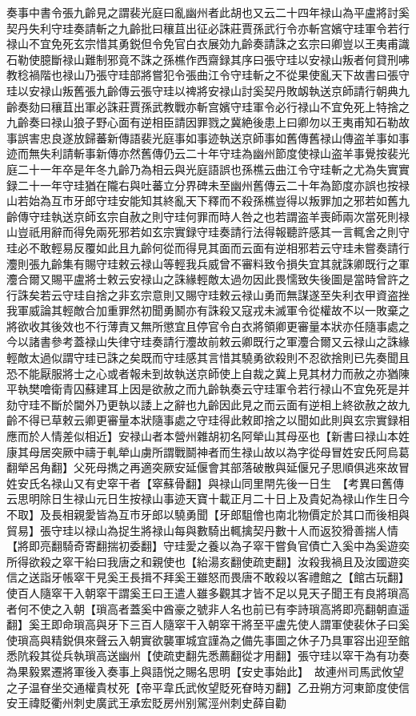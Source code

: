 奏事中書令張九齡見之謂裴光庭曰亂幽州者此胡也又云二十四年禄山為平盧將討奚契丹失利守珪奏請斬之九齡批曰穰苴出征必誅莊賈孫武行令亦斬宫嬪守珪軍令若行禄山不宜免死玄宗惜其勇鋭但令免官白衣展効九齡奏請誅之玄宗曰卿豈以王夷甫識石勒使臆斷禄山難制邪竟不誅之孫樵作西齋録其序曰張守珪以安禄山叛者何貸刑咈教稔禍階也禄山乃張守珪部將嘗犯令張曲江令守珪斬之不從果使亂天下故書曰張守珪以安禄山叛舊張九齡傳云張守珪以禆將安禄山討奚契丹敗衂執送京師請行朝典九齡奏劾曰穰苴出軍必誅莊賈孫武教戰亦斬宫嬪守珪軍令必行禄山不宜免死上特捨之九齡奏曰禄山狼子野心面有逆相臣請因罪戮之冀絶後患上曰卿勿以王夷甫知石勒故事誤害忠良遂放歸蕃新傳語裴光庭事如事迹執送京師事如舊傳舊禄山傳盗羊事如事迹而無失利請斬事新傳亦然舊傳仍云二十年守珪為幽州節度使禄山盗羊事覺按裴光庭二十一年卒是年冬九齡乃為相云與光庭語誤也孫樵云曲江令守珪斬之尤為失實實録二十一年守珪猶在隴右與吐蕃立分界碑未至幽州舊傳云二十年為節度亦誤也按禄山若始為互市牙郎守珪安能知其終亂天下釋而不殺孫樵豈得以叛罪加之邪若如舊九齡傳守珪執送京師玄宗自赦之則守珪何罪而時人咎之也若謂盗羊喪師兩次當死則禄山豈祇用辭而得免兩死邪若如玄宗實録守珪奏請行法得報聽許感其一言輒舍之則守珪必不敢輕易反覆如此且九齡何從而得見其面而云面有逆相邪若云守珪未嘗奏請行灋則張九齡集有賜守珪敕云禄山等輕我兵威曾不審料致令損失宜其就誅卿既行之軍灋合爾又賜平盧將士敕云安禄山之誅緣輕敵太過勿因此畏懦致失後圖是當時曾許之行誅矣若云守珪自捨之非玄宗意則又賜守珪敕云禄山勇而無謀遂至失利衣甲資盗挫我軍威論其輕敵合加重罪然初聞勇鬭亦有誅殺又寇戎未滅軍令從權故不以一敗棄之將欲收其後效也不行薄責又無所懲宜且停官令白衣將領卿更審量本狀亦任隨事處之今以諸書參考蓋禄山失律守珪奏請行灋故前敕云卿既行之軍灋合爾又云禄山之誅緣輕敵太過似謂守珪已誅之矣既而守珪感其言惜其驍勇欲殺則不忍欲捨則已先奏聞且恐不能厭服將士之心或者報未到故執送京師使上自裁之冀上見其材力而赦之亦猶陳平執樊噲衛青囚蘇建耳上因是欲赦之而九齡執奏云守珪軍令若行禄山不宜免死是并劾守珪不斷於閫外乃更執以諉上之辭也九齡因此見之而云面有逆相上終欲赦之故九齡不得已草敕云卿更審量本狀隨事處之守珪得此敕即捨之以聞如此則與玄宗實録相應而於人情差似相近】安禄山者本營州雜胡初名阿犖山其母巫也【新書曰禄山本姓康其母居突厥中禱于軋犖山虜所謂戰鬬神者而生禄山故以為字從母冒姓安氏阿烏葛翻犖呂角翻】父死母擕之再適突厥安延偃會其部落破散與延偃兄子思順俱逃來故冒姓安氏名禄山又有史窣干者【窣蘇骨翻】與禄山同里閈先後一日生　【考異曰舊傳云思明除日生禄山元日生按禄山事迹天寶十載正月二十日上及貴妃為禄山作生日今不取】及長相親愛皆為互市牙郎以驍勇聞【牙郎駔儈也南北物價定於其口而後相與貿易】張守珪以禄山為捉生將禄山每與數騎出輒擒契丹數十人而返狡猾善揣人情【將即亮翻騎奇寄翻揣初委翻】守珪愛之養以為子窣干嘗負官債亡入奚中為奚遊奕所得欲殺之窣干紿曰我唐之和親使也【紿湯亥翻使疏吏翻】汝殺我禍且及汝國遊奕信之送詣牙帳窣干見奚王長揖不拜奚王雖怒而畏唐不敢殺以客禮館之【館古玩翻】使百人隨窣干入朝窣干謂奚王曰王遣人雖多觀其才皆不足以見天子聞王有良將瑣高者何不使之入朝【瑣高者蓋奚中酋豪之號非人名也前已有李詩瑣高將即亮翻朝直遥翻】奚王即命瑣高與牙下三百人隨窣干入朝窣干將至平盧先使人謂軍使裴休子曰奚使瑣高與精鋭俱來聲云入朝實欲襲軍城宜謹為之備先事圖之休子乃具軍容出迎至館悉阬殺其從兵執瑣高送幽州【使疏吏翻先悉薦翻從才用翻】張守珪以窣干為有功奏為果毅累遷將軍後入奏事上與語悦之賜名思明【安史事始此】　故連州司馬武攸望之子温眘坐交通權貴杖死【帝平韋氏武攸望貶死眘時刃翻】乙丑朔方河東節度使信安王禕貶衢州刺史廣武王承宏貶房州别駕涇州刺史薛自勸